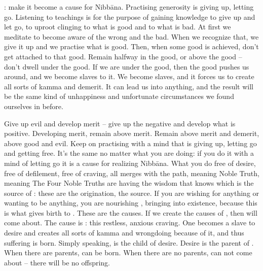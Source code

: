: make it become a cause for Nibb\=ana. Practising generosity is giving up, letting go. Listening to teachings is for the purpose of gaining knowledge to give up and let go, to uproot clinging to what is good and to what is bad. At first we meditate to become aware of the wrong and the bad. When we recognize that, we give it up and we practise what is good. Then, when some good is achieved, don't get attached to that good. Remain halfway in the good, or above the good -- don't dwell under the good. If we are under the good, then the good pushes us around, and we become slaves to it. We become slaves, and it forces us to create all sorts of kamma and demerit. It can lead us into anything, and the result will be the same kind of unhappiness and unfortunate circumstances we found ourselves in before.

Give up evil and develop merit -- give up the negative and develop what is positive. Developing merit, remain above merit. Remain above merit and demerit, above good and evil. Keep on practising with a mind that is giving up, letting go and getting free. It's the same no matter what you are doing: if you do it with a mind of letting go it is a cause for realizing Nibb\=ana. What you do free of desire, free of defilement, free of craving, all merges with the path, meaning Noble Truth, meaning  The Four Noble Truths are having the wisdom that knows  which is the source of    : these are the origination, the source. If you are wishing for anything or wanting to be anything, you are nourishing , bringing  into existence, because this is what gives birth to . These are the causes. If we create the causes of , then  will come about. The cause is : this restless, anxious craving. One becomes a slave to desire and creates all sorts of kamma and wrongdoing because of it, and thus suffering is born. Simply speaking,  is the child of desire. Desire is the parent of . When there are parents,  can be born. When there are no parents,  can not come about -- there will be no offspring.

